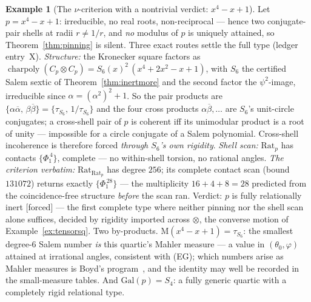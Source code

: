 \documentclass[11pt]{article}
\theoremstyle{plain}
\theoremstyle{definition}
\newtheorem{example}[theorem]{Example}
\theoremstyle{remark}
\newcommand{\Mah}{\mathrm{M}}
\newcommand{\Rat}{\mathrm{Rat}}
\newcommand{\F}{\textnormal{[forced]}}
\begin{document}
\begin{example}[The $\nu$-criterion with a nontrivial verdict: $x^4-x+1$]
\label{ex:x4quartic}
Let $p=x^4-x+1$: irreducible, no real roots, non-reciprocal --- hence two
conjugate-pair shells at radii $r\neq1/r$, and \emph{no} modulus of $p$ is
uniquely attained, so Theorem~\ref{thm:pinning} is silent. Three exact
routes settle the full type (ledger entry~X). \emph{Structure:} the
Kronecker square factors as
$\operatorname{charpoly}(C_p\otimes C_p)=S_6(x)^2\,(x^4+2x^2-x+1)$, with
$S_6$ the certified Salem sextic of Theorem~\ref{thm:inertmore} and the
second factor the $\psi^2$-image, irreducible since
$\alpha=(\alpha^2)^2+1$. So the pair products are
$\{\alpha\overline\alpha,\,\beta\overline\beta\}
=\{\tau_{S_6},\,1/\tau_{S_6}\}$ and the four cross products
$\alpha\overline\beta,\dots$ are $S_6$'s unit-circle conjugates; a
cross-shell pair of $p$ is coherent iff its unimodular product is a root of
unity --- impossible for a circle conjugate of a Salem polynomial.
Cross-shell incoherence is therefore forced \emph{through $S_6$'s own
rigidity}. \emph{Shell scan:} $\Rat_p$ has contacts $\{\Phi_1^{\,4}\}$,
complete --- no within-shell torsion, no rational angles. \emph{The
criterion verbatim:} $\Rat_{\Rat_p}$ has degree $256$; its complete contact
scan (bound $131072$) returns exactly $\{\Phi_1^{\,28}\}$ --- the
multiplicity $16+4+8=28$ predicted from the coincidence-free structure
\emph{before} the scan ran. Verdict: $p$ is fully relationally inert \F{}
--- the first complete type where neither pinning nor the shell scan alone
suffices, decided by rigidity imported across $\otimes$, the converse
motion of Example~\ref{ex:tensorsq}. Two by-products.
$\Mah(x^4-x+1)=\tau_{S_6}$: the smallest degree-$6$ Salem number \emph{is}
this quartic's Mahler measure --- a value in $(\theta_0,\varphi)$ attained
at irrational angles, consistent with \textup{(EG)}; which numbers arise as
Mahler measures is Boyd's program~\cite{Boyd}, and the identity may well be
recorded in the small-measure tables. And $\mathrm{Gal}(p)=S_4$: a fully
generic quartic with a completely rigid relational type.
\end{example}
\end{document}
